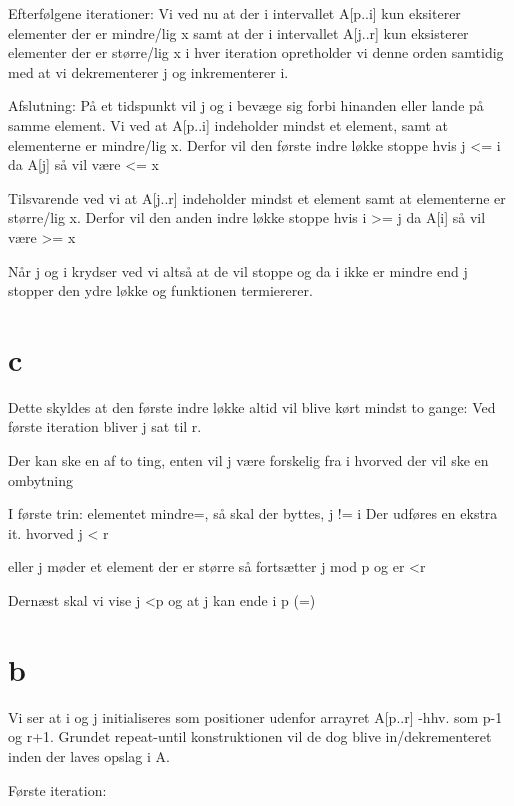 Efterfølgene iterationer:
Vi ved nu at der i intervallet A[p..i] kun eksiterer elementer der er mindre/lig x samt at der i intervallet A[j..r] kun eksisterer elementer der er større/lig x
i hver iteration opretholder vi denne orden samtidig med at vi dekrementerer j og inkrementerer i.


Afslutning:
På et tidspunkt vil j og i bevæge sig forbi hinanden eller lande på samme element. 
Vi ved at A[p..i] indeholder mindst et element, samt at elementerne er mindre/lig x. Derfor vil den første indre løkke stoppe hvis j <= i da A[j] så vil være <= x

Tilsvarende ved vi at A[j..r] indeholder mindst et element samt at elementerne er større/lig x. Derfor vil den anden indre løkke stoppe hvis i >= j da A[i] så vil være >= x

Når j og i krydser ved vi altså at de vil stoppe og da i ikke er mindre end j stopper den ydre løkke og funktionen termiererer. 



\section{c}
Dette skyldes at den første indre løkke altid vil blive kørt mindst to gange: Ved første iteration bliver j sat til r. 




Der kan ske en af to ting, enten vil j være forskelig fra i hvorved der vil ske en ombytning




I første trin:
elementet mindre=, så skal der byttes, j != i
Der udføres en ekstra it. hvorved j < r

eller
j møder et element der er større så fortsætter j mod p og er <r




Dernæst skal vi vise
j <p
og at j kan ende i p (=)









\section{b}
Vi ser at i og j initialiseres som positioner udenfor arrayret A[p..r] -hhv. som p-1 og r+1.
Grundet repeat-until konstruktionen vil de dog blive in/dekrementeret inden der laves opslag i A.

Første iteration:

